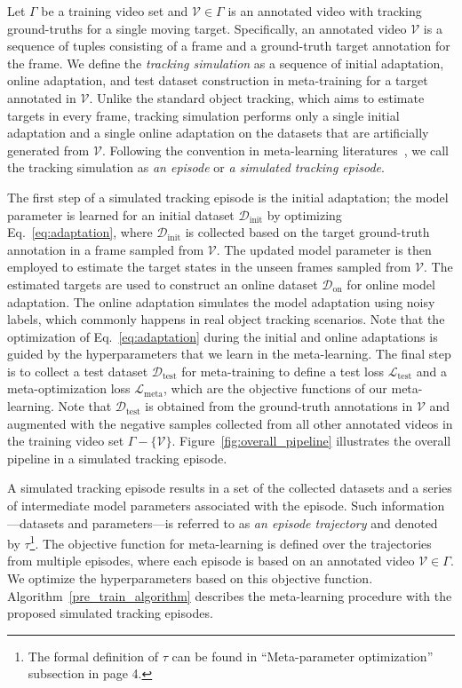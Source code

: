 \documentclass[letterpaper]{article} %
\def \datainit{\mathcal{D}_\text{init}}
\def \dataonline{\mathcal{D}_\text{on}}
\def \dataval{\mathcal{D}_\text{test}}
\def \lossval{\mathcal{L}_\text{test}}
\def \lossmeta{\mathcal{L}_\text{meta}}
\begin{document}
Let $\Gamma$ be a training video set and $\mathcal{V} \in \Gamma$ is an annotated video with tracking ground-truths for a single moving target.
Specifically, an annotated video $\mathcal{V}$ is a sequence of tuples consisting of a frame and a ground-truth target annotation for the frame.
We define the \textit{tracking simulation} as a sequence of initial adaptation, online adaptation, and test dataset construction in meta-training for a target annotated in $\mathcal{V}$.
Unlike the standard object tracking, which aims to estimate targets in every frame, tracking simulation performs only a single initial adaptation and a single online adaptation on the datasets that are artificially generated from $\mathcal{V}$.
Following the convention in meta-learning literatures~\cite{santoro2016meta,finn2017model_agnostic}, we call the tracking simulation as \textit{an episode} or \textit{a simulated tracking episode}.

The first step of a simulated tracking episode is the initial adaptation; the model parameter is learned for an initial dataset $\datainit$ by optimizing Eq.~\eqref{eq:adaptation}, where $\datainit$ is collected based on the target ground-truth annotation in a frame sampled from $\mathcal{V}$.
The updated model parameter is then employed to estimate the target states in the unseen frames sampled from $\mathcal{V}$.
The estimated targets are used to construct an online dataset $\dataonline$ for online model adaptation.
The online adaptation simulates the model adaptation using noisy labels, which commonly happens in real object tracking scenarios.
Note that the optimization of Eq.~\eqref{eq:adaptation} during the initial and online adaptations is guided by the hyperparameters that we learn in the meta-learning.
The final step is to collect a test dataset $\dataval$ for meta-training to define a test loss $\lossval$ and a meta-optimization loss $\lossmeta$, which are the objective functions of our meta-learning.
Note that $\dataval$ is obtained from the ground-truth annotations in $\mathcal{V}$ and augmented with the negative samples collected from all other annotated videos in the training video set $\Gamma - \{\mathcal{V}\}$.
Figure~\ref{fig:overall_pipeline} illustrates the overall pipeline in a simulated tracking episode.

A simulated tracking episode results in a set of the collected datasets and a series of intermediate model parameters associated with the episode.
Such information---datasets and parameters---is referred to as \textit{an episode trajectory} and denoted by $\tau$\footnote{The formal definition of $\tau$ can be found in ``Meta-parameter optimization'' subsection in page 4.}.
The objective function for meta-learning is defined over the trajectories from multiple episodes, where each episode is based on an annotated video $\mathcal{V} \in \Gamma$.
We optimize the hyperparameters based on this objective function.
Algorithm~\ref{pre_train_algorithm} describes the meta-learning procedure with the proposed simulated tracking episodes.
\end{document}
